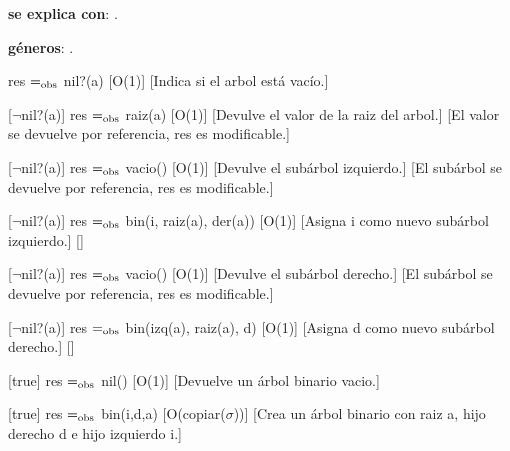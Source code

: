 \begin{Interfaz}
  
  
  \textbf{se explica con}: .
  
  \textbf{g\'eneros}: .


  {res $=_{\mathrm{obs}}$ nil?(a)}
  [O(1)]
  [Indica si el arbol est\'a vac\'io.]

  [$\neg$nil?(a)]
  {res $=_{\mathrm{obs}}$ raiz(a)}
  [O(1)]
  [Devulve el valor de la raiz del arbol.]
  [El valor se devuelve por referencia, res es modificable.]
  
  [$\neg$nil?(a)]  
  {res $=_{\mathrm{obs}}$ vacio()}
  [O(1)]
  [Devulve el subárbol izquierdo.]
  [El subárbol se devuelve por referencia, res es modificable.]
  
  [$\neg$nil?(a)]  
  {res $=_{\mathrm{obs}}$ bin(i, raiz(a), der(a))}
  [O(1)]
  [Asigna i como nuevo subárbol izquierdo.]
  []
  
  [$\neg$nil?(a)]  
  {res $=_{\mathrm{obs}}$ vacio()}
  [O(1)]
  [Devulve el subárbol derecho.]
  [El subárbol se devuelve por referencia, res es modificable.]
  
  [$\neg$nil?(a)]  
  {res $=_{\mathrm{obs}}$ bin(izq(a), raiz(a), d)}
  [O(1)]
  [Asigna d como nuevo subárbol derecho.]
  []
  
  [true]
  {res $=_{\mathrm{obs}}$ nil()}
  [O(1)]
  [Devuelve un \'arbol binario vacio.]
  
  [true]
  {res $=_{\mathrm{obs}}$ bin(i,d,a)}
  [O(copiar($\sigma$))]
  [Crea un \'arbol binario con raiz a, hijo derecho d e hijo izquierdo i.]

\end{Interfaz}

